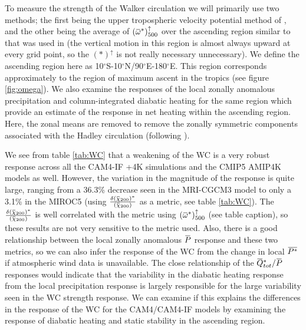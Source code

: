 \documentclass[letterpaper,12pt,titlepage,oneside,final]{book}
\newcommand{\overbar}[1]{\mkern 1.5mu\overline{\mkern-1.5mu#1\mkern-1.5mu}\mkern 1.5mu}
\begin{document}
To measure the strength of the Walker circulation we will primarily use two methods; the first being the upper tropospheric velocity potential method of \citep{tanaka_trend_2004}, and the other being the average of $(\overbar{\omega}^{*})_{500}^{\uparrow}$ over the ascending region similar to that was used in \citep{wills_local_2017} (the vertical motion in this region is almost always upward at every grid point, so the $(*)^{\uparrow}$ is not really necessary unnecessary). We define the ascending region here as 10$^{\circ}$S-10$^{\circ}$N/90$^{\circ}$E-180$^{\circ}$E. This region corresponds approximately to the region of maximum ascent in the tropics (see figure \ref{fig:omega}). We also examine the responses of the local zonally anomalous precipitation and column-integrated diabatic heating for the same region which provide an estimate of the response in net heating within the ascending region. Here, the zonal means are removed to remove the zonally symmetric components associated with the Hadley circulation (following \cite{wills_local_2017}).

We see from table \ref{tab:WC} that a weakening of the WC is a very robust response across all the CAM4-IF +4K simulations and the CMIP5 AMIP4K models as well. However, the variation in the magnitude of the response is quite large, ranging from a 36.3\% decrease seen in the MRI-CGCM3 model to only a 3.1\% in the MIROC5 (using $\frac{\delta(\overbar{\chi}_{200})^{*}}{(\overbar{\chi}_{200})}$ as a metric, see table \ref{tab:WC}). The $\frac{\delta(\overbar{\chi}_{200})^{*}}{(\overbar{\chi}_{200})}$ is well correlated with the metric using ${(\overbar{\omega}^{*})_{500}^{\uparrow}}$ (see table caption), so these results are not very sensitive to the metric used. Also, there is a good relationship between the local zonally anomalous $\overbar{P}$ response and these two metrics, so we can also infer the response of the WC from the change in local $\overbar{P^{*}}$ if atmospheric wind data is unavailable. The close relationship of the $\overbar{Q}_{tot}^{*}/\overbar{P}$ responses would indicate that the variability in the diabatic heating response from the local precipitation response is largely responsible for the large variability seen in the WC strength response. We can examine if this explains the differences in the response of the WC for the CAM4/CAM4-IF models by examining the response of diabatic heating and static stability in the ascending region.
\end{document}
